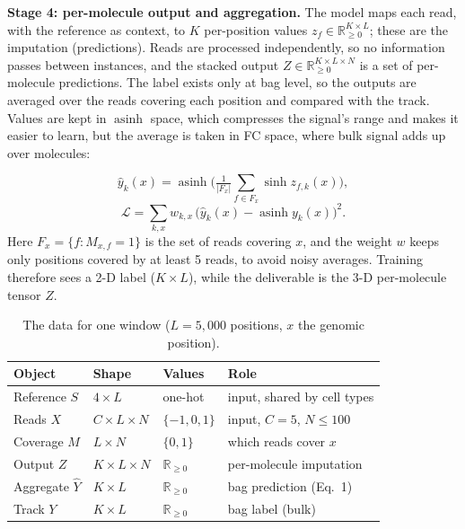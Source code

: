 \documentclass[acmtog,nonacm]{acmart}   %
\begin{document}
\textbf{Stage 4: per-molecule output and aggregation.} The model maps each read, with
the reference as context, to $K$ per-position values $z_f\in\mathbb{R}_{\ge0}^{K\times L}$;
these are the imputation (predictions). Reads are processed independently, so no information
passes between instances, and the stacked output $Z\in\mathbb{R}_{\ge0}^{K\times L\times N}$
is a set of per-molecule predictions. The label exists only at bag level, so the outputs are
averaged over the reads covering each position and compared with the track. Values are kept in
$\operatorname{asinh}$ space, which compresses the signal's range and makes it easier to learn,
but the average is taken in FC space, where bulk signal adds up over molecules:

\begin{equation}
\hat y_k(x) = \operatorname{asinh}\Big(\tfrac{1}{|F_x|}\textstyle\sum_{f\in F_x}\sinh z_{f,k}(x)\Big),
\end{equation}
\begin{equation}
\mathcal{L}=\textstyle\sum_{k,x} w_{k,x}\,\big(\hat y_k(x)-\operatorname{asinh} y_k(x)\big)^2 .
\end{equation}
Here $F_x=\{f: M_{x,f}=1\}$ is the set of reads covering $x$, and the weight $w$ keeps only
positions covered by at least 5 reads, to avoid noisy averages. Training therefore
sees a 2-D label ($K\times L$), while the deliverable is the 3-D per-molecule tensor $Z$.

\begin{table}[h]
\caption{The data for one window ($L=5{,}000$ positions, $x$ the genomic position).}
\label{tab:data}
\small
\begin{tabular}{@{}llll@{}}
\toprule
Object & Shape & Values & Role \\
\midrule
Reference $S$ & $4\times L$ & one-hot & input, shared by cell types \\
Reads $X$ & $C\times L\times N$ & $\{-1,0,1\}$ & input, $C=5$, $N\le100$ \\
Coverage $M$ & $L\times N$ & $\{0,1\}$ & which reads cover $x$ \\
Output $Z$ & $K\times L\times N$ & $\mathbb{R}_{\ge0}$ & per-molecule imputation \\
Aggregate $\hat Y$ & $K\times L$ & $\mathbb{R}_{\ge0}$ & bag prediction (Eq.~1) \\
Track $Y$ & $K\times L$ & $\mathbb{R}_{\ge0}$ & bag label (bulk) \\
\bottomrule
\end{tabular}
\end{table}
\end{document}
